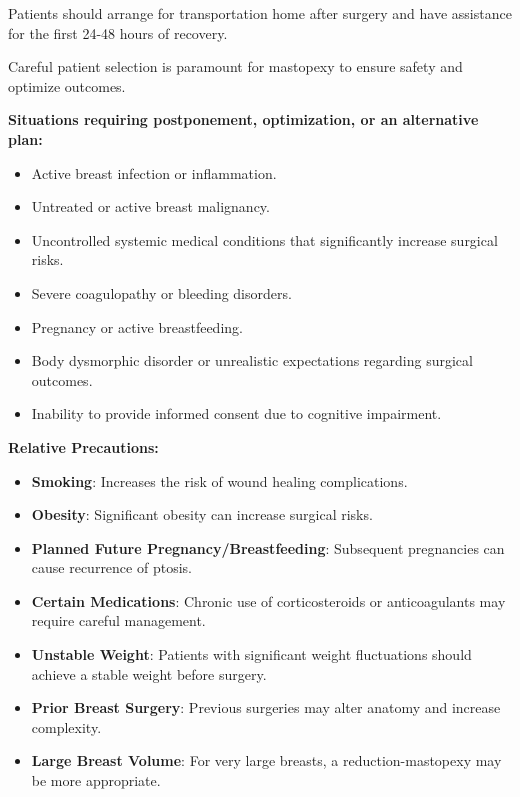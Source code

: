 Patients should arrange for transportation home after surgery and have assistance for the first 24-48 hours of recovery.

Careful patient selection is paramount for mastopexy to ensure safety and optimize outcomes.

\textbf{Situations requiring postponement, optimization, or an alternative plan:}
\begin{itemize}
  \item Active breast infection or inflammation.
  \item Untreated or active breast malignancy.
  \item Uncontrolled systemic medical conditions that significantly increase surgical risks.
  \item Severe coagulopathy or bleeding disorders.
  \item Pregnancy or active breastfeeding.
  \item Body dysmorphic disorder or unrealistic expectations regarding surgical outcomes.
  \item Inability to provide informed consent due to cognitive impairment.
\end{itemize}

\textbf{Relative Precautions:}
\begin{itemize}
  \item \textbf{Smoking}: Increases the risk of wound healing complications.
  
  \item \textbf{Obesity}: Significant obesity can increase surgical risks.
  
  \item \textbf{Planned Future Pregnancy/Breastfeeding}: Subsequent pregnancies can cause recurrence of ptosis.
  
  \item \textbf{Certain Medications}: Chronic use of corticosteroids or anticoagulants may require careful management.
  
  \item \textbf{Unstable Weight}: Patients with significant weight fluctuations should achieve a stable weight before surgery.
  
  \item \textbf{Prior Breast Surgery}: Previous surgeries may alter anatomy and increase complexity.
  
  \item \textbf{Large Breast Volume}: For very large breasts, a reduction-mastopexy may be more appropriate.
\end{itemize}

